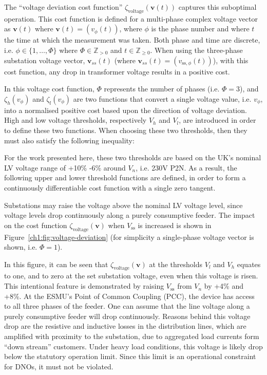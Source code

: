 The ``voltage deviation cost function'' $\zeta_\text{voltage}(\textbf{v}(t))$ captures this suboptimal operation.
This cost function is defined for a multi-phase complex voltage vector as $\textbf{v}(t)$ where $\textbf{v}(t) = (v_\phi(t))$, where $\phi$ is the phase number and where $t$ the time at which the measurement was taken.
Both phase and time are discrete, i.e. $\phi \in \{1,\dots,\Phi\}$ where $\Phi \in \mathbb{Z}_{>0}$ and $t \in \mathbb{Z}_{\geq0}$.
When using the three-phase substation voltage vector, $\textbf{v}_{ss}(t)$ (where $\textbf{v}_{ss}(t) = (v_{\text{ss},\phi}(t))$), with this cost function, any drop in transformer voltage results in a positive cost.



In this voltage cost function, $\Phi$ represents the number of phases (i.e. $\Phi = 3$), and $\zeta_h(v_\phi)$ and $\zeta_l(v_\phi)$ are two functions that convert a single voltage value, i.e. $v_\phi$, into a normalised positive cost based upon the direction of voltage deviation.
High and low voltage thresholds, respectively $V_h$ and $V_l$, are introduced in order to define these two functions.
When choosing these two thresholds, then they must also satisfy the following inequality:



For the work presented here, these two thresholds are based on the UK's nominal LV voltage range of +10\% -6\% around $V_n$, i.e. 230V P2N.
As a result, the following upper and lower threshold functions are defined, in order to form a continuously differentiable cost function with a single zero tangent.



Substations may raise the voltage above the nominal LV voltage level, since voltage levels drop continuously along a purely consumptive feeder.
The impact on the cost function $\zeta_\text{voltage}(\textbf{v})$ when $V_\text{ss}$ is increased is shown in Figure~\ref{ch1:fig:voltage-deviation} (for simplicity a single-phase voltage vector is shown, i.e. $\Phi = 1$).



In this figure, it can be seen that $\zeta_\text{voltage}(\textbf{v})$ at the thresholds $V_l$ and $V_h$ equates to one, and to zero at the set substation voltage, even when this voltage is risen.
This intentional feature is demonstrated by raising $V_\text{ss}$ from $V_n$ by +4\% and +8\%.
At the ESMU's Point of Common Coupling (PCC), the device has access to all three phases of the feeder.
One can assume that the line voltage along a purely consumptive feeder will drop continuously.
Reasons behind this voltage drop are the resistive and inductive losses in the distribution lines, which are amplified with proximity to the substation, due to aggregated load currents form ``down stream'' customers.
Under heavy load conditions, this voltage is likely drop below the statutory operation limit.
Since this limit is an operational constraint for DNOs, it must not be violated.

